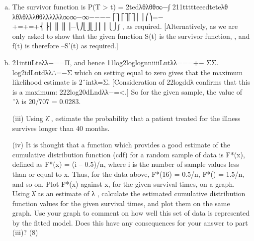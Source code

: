 \documentclass[a4paper,12pt]{article}
\begin{document}
\begin{enumerate}[(a)]
\item The survivor function is P(T > t) = 2tedλθλθθ∞−∫
211ttttteeedteteλθ λθλθλλλθθλλλλλλ∞∞−∞−−−−⎧⎫⎡⎤⎡⎤⎪⎪⎛⎞=−+=+=+⎨⎬⎜⎟⎢⎥⎢⎥−⎝⎠⎣⎦⎣⎦⎪⎪⎩⎭∫ ,
as required.
[Alternatively, as we are only asked to show that the given function S(t) is the survivor function, , and f(t) is therefore –S'(t) as required.]
\item 21intiiLteλλ−==Π, and hence 11log2loglognniiiiLntλλ===+− ΣΣ.
log2idLntdλλ∴=−Σ which on setting equal to zero gives that the maximum likelihood estimate is 2ˆintλ=Σ. [Consideration of 22logddλ confirms that this is a maximum: 222log20dLndλλ−=<.]
So for the given sample, the value of ˆλ is 20/707 = 0.0283.

\newpage
\begin{framed}
(iii) Using λ̂ , estimate the probability that a patient treated for the illness survives
longer than 40 months.

(iv) It is thought that a function which provides a good estimate of the cumulative
distribution function (cdf) for a random sample of data is F*(x), defined as
F*(x) = (i – 0.5)/n, where i is the number of sample values less than or equal
to x. Thus, for the data above, F*(16) = 0.5/n, F*() = 1.5/n, and so on.
Plot F*(x) against x, for the given survival times, on a graph. Using λ̂ as an
estimate of λ , calculate the estimated cumulative distribution function values
for the given survival times, and plot them on the same graph.
Use your graph to comment on how well this set of data is represented by the
fitted model. Does this have any consequences for your answer to part (iii)?
(8)
\end{framed}


\end{enumerate}
\end{document}

